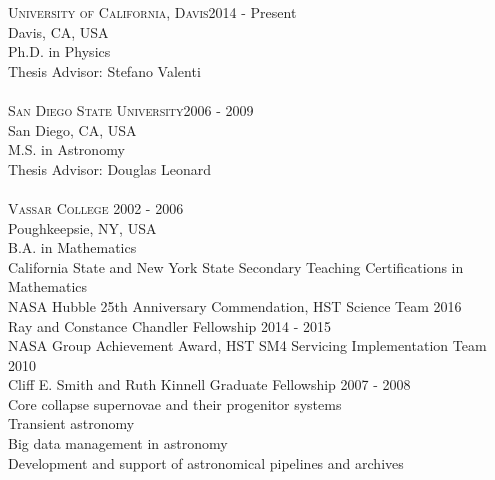 \documentclass[10pt]{cv}
\begin{document}
\begin{llist}
\vspace{-0.1in}   
\textsc{University of California, Davis}\hfill 2014 - Present\\
Davis, CA, USA \\
Ph.D. in Physics \\
Thesis Advisor: Stefano Valenti \\
\\
\textsc{San Diego State University}\hfill 2006 - 2009\\
San Diego, CA, USA \\
M.S. in Astronomy \\
Thesis Advisor: Douglas Leonard \\
\\
\textsc{Vassar College} \hfill 2002 - 2006 \\
Poughkeepsie, NY, USA \\
B.A. in Mathematics \\
California State and New York State Secondary Teaching Certifications in Mathematics \\
\vspace{-0.1in}   
NASA Hubble 25th Anniversary Commendation, HST Science Team \hfill 2016 \\ %
Ray and Constance Chandler Fellowship \hfill 2014 - 2015 \\ %
NASA Group Achievement Award, HST SM4 Servicing Implementation Team \hfill2010 \\
Cliff E. Smith and Ruth Kinnell Graduate Fellowship \hfill 2007 - 2008\\ %
\vspace{-0.1in}   
Core collapse supernovae and their progenitor systems\\
Transient astronomy\\
Big data management in astronomy\\
Development and support of astronomical pipelines and archives\\ 

\end{llist}
\end{document}

